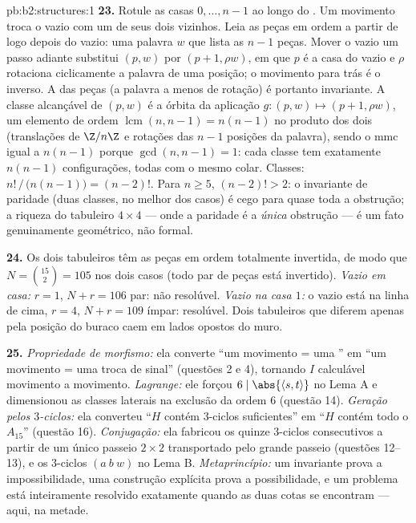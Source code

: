 \begin{solution}{pb:b2:structures:1}
\textbf{23.} Rotule as casas $0, \dots, n-1$ ao longo do .
Um movimento troca o vazio com um de seus dois vizinhos. Leia as
peças em ordem  a partir de logo depois do vazio: uma palavra $w$
que lista as $n - 1$ peças. Mover o vazio um passo adiante
substitui $(p, w)$ por $(p + 1, \rho w)$, em que $p$ é a casa do
vazio e $\rho$ rotaciona ciclicamente a palavra de uma posição; o movimento
para trás é o inverso. A  \emph{} das peças (a
palavra a menos de rotação) é portanto invariante. A classe alcançável de
$(p, w)$ é a órbita da aplicação $g \colon (p, w) \mapsto (p+1,
\rho w)$, um elemento de ordem $\operatorname{lcm}(n, n-1) =
n(n-1)$ no produto dos dois  (translações de
$\Z/n\Z$ e rotações das $n-1$ posições da palavra), sendo o mmc
igual a $n(n-1)$ porque $\gcd(n, n-1) = 1$: cada classe tem
exatamente $n(n-1)$ configurações, todas com o mesmo colar.
Classes: $n!\,/\,\bigl(n(n-1)\bigr) = (n-2)!$. Para $n \geq 5$,
$(n-2)! > 2$: o invariante de paridade (duas classes, no melhor dos casos) é
cego para quase toda a obstrução; a riqueza do tabuleiro $4
\times 4$ --- onde a paridade é a \emph{única} obstrução
--- é um fato genuinamente geométrico, não formal.

\textbf{24.} Os dois tabuleiros têm as peças em ordem totalmente invertida,
de modo que $N = \binom{15}{2} = 105$ nos dois casos (todo par de peças
está invertido). \emph{Vazio em casa:} $r = 1$, $N + r = 106$ par:
não resolúvel. \emph{Vazio na casa $1$:} o vazio está na linha
de cima, $r = 4$, $N + r = 109$ ímpar: resolúvel. Dois tabuleiros que diferem
apenas pela posição do buraco caem em lados opostos do muro.

\textbf{25.} \emph{Propriedade de morfismo:} ela converte ``um movimento =
uma '' em ``um movimento = uma troca de sinal'' (questões
2 e 4), tornando $I$ calculável movimento a movimento. \emph{Lagrange:} ele
forçou $6 \mid \abs{\langle s, t\rangle}$ no Lema A e dimensionou
as classes laterais na exclusão da ordem $6$ (questão 14).
\emph{Geração pelos $3$-ciclos:} ela converteu ``$H$ contém
$3$-ciclos suficientes'' em ``$H$ contém todo o $A_{15}$''
(questão 16). \emph{Conjugação:} ela fabricou os quinze
$3$-ciclos consecutivos a partir de um único passeio $2 \times 2$
transportado pelo grande passeio (questões 12--13), e os
$3$-ciclos $(a\ b\ w)$ no Lema B. \emph{Metaprincípio:} um
invariante prova a impossibilidade, uma construção explícita prova a
possibilidade, e um problema está inteiramente resolvido exatamente quando as duas
cotas se encontram --- aqui, na metade.
\end{solution}
